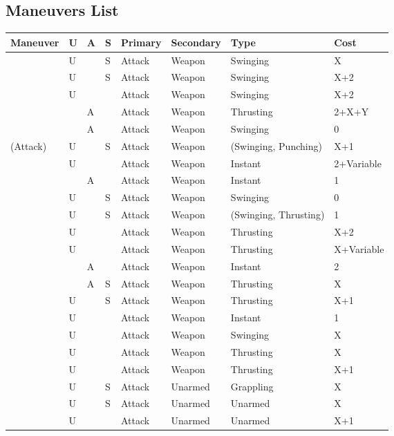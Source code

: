 \documentclass[oneside,11pt,english]{book}
\begin{document}
\subsection{Maneuvers List}
\begin{longtabu} to 
Maneuver& U &A &S &Primary &Secondary &Type &Cost\\\toprule
{} &U &&S &Attack&Weapon&Swinging& X \\
 &U &&S &Attack&Weapon&Swinging& X+2 \\
 &U&& &Attack&Weapon&Swinging& X+2 \\
 &&A& &Attack&Weapon&Thrusting& 2+X+Y \\
 &&A& &Attack&Weapon&Swinging& 0 \\
 (Attack) &U&& S &Attack&Weapon& (Swinging, Punching) &X+1\\
 &U&& &Attack&Weapon&Instant& 2+Variable\\
 &  &A &  &Attack&Weapon&Instant& 1\\
  &U&&S &Attack&Weapon&Swinging& 0 \\
 &U&&S &Attack&Weapon& (Swinging, Thrusting) &1\\
 &U&& &Attack&Weapon&Thrusting& X+2\\
 &U &&&Attack&Weapon&Thrusting& X+Variable\\
 &&A& &Attack&Weapon&Instant& 2\\
 &&A& S &Attack&Weapon&Thrusting& X \\
 &U&& S &Attack&Weapon&Thrusting& X+1\\
 &U&&&Attack&Weapon&Instant& 1 \\
 &U&& &Attack&Weapon&Swinging& X \\
 &U&& &Attack&Weapon&Thrusting& X \\
 &U&& &Attack&Weapon&Thrusting& X+1 \\
 &U&& S& Attack &Unarmed &Grappling &X\\
 &U&& S &Attack &Unarmed &Unarmed & X \\
 &U &&&Attack &Unarmed &Unarmed & X+1 \\

\end{longtabu}
\end{document}
